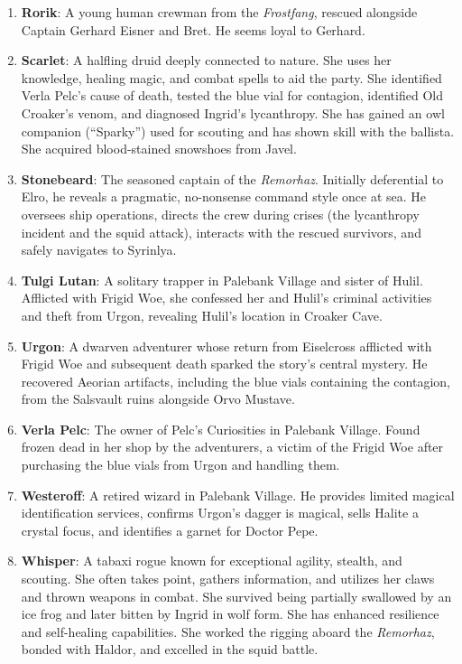 \documentclass[
  letterpaper,12pt,twoside,twocolumn,openany,
  nodeprecatedcode,bg=full]{dndbook}
\begin{document}
\begin{enumerate}
  cheek. He accompanied Urgon on the expedition where the blue vials
  were found in the Salsvault ruins (located in the Thin Sheets region).
  He provides the party with directions, details about the ruin's
  dangers (Ice Mephits, animated armor), confirms he sold his share of
  artifacts to The Buyer, and directs them to Javel for snowshoes. He is
  saddened and angered by Urgon's death.
\item
  \textbf{Rorik}: A young human crewman from the \emph{Frostfang},
  rescued alongside Captain Gerhard Eisner and Bret. He seems loyal to
  Gerhard.
\item
  \textbf{Scarlet}: A halfling druid deeply connected to nature. She
  uses her knowledge, healing magic, and combat spells to aid the party.
  She identified Verla Pelc's cause of death, tested the blue vial for
  contagion, identified Old Croaker's venom, and diagnosed Ingrid's
  lycanthropy. She has gained an owl companion (``Sparky'') used for
  scouting and has shown skill with the ballista. She acquired
  blood-stained snowshoes from Javel.
\item
  \textbf{Stonebeard}: The seasoned captain of the \emph{Remorhaz}.
  Initially deferential to Elro, he reveals a pragmatic, no-nonsense
  command style once at sea. He oversees ship operations, directs the
  crew during crises (the lycanthropy incident and the squid attack),
  interacts with the rescued survivors, and safely navigates to
  Syrinlya.
\item
  \textbf{Tulgi Lutan}: A solitary trapper in Palebank Village and
  sister of Hulil. Afflicted with Frigid Woe, she confessed her and
  Hulil's criminal activities and theft from Urgon, revealing Hulil's
  location in Croaker Cave.
\item
  \textbf{Urgon}: A dwarven adventurer whose return from Eiselcross
  afflicted with Frigid Woe and subsequent death sparked the story's
  central mystery. He recovered Aeorian artifacts, including the blue
  vials containing the contagion, from the Salsvault ruins alongside
  Orvo Mustave.
\item
  \textbf{Verla Pelc}: The owner of Pelc's Curiosities in Palebank
  Village. Found frozen dead in her shop by the adventurers, a victim of
  the Frigid Woe after purchasing the blue vials from Urgon and handling
  them.
\item
  \textbf{Westeroff}: A retired wizard in Palebank Village. He provides
  limited magical identification services, confirms Urgon's dagger is
  magical, sells Halite a crystal focus, and identifies a garnet for
  Doctor Pepe.
\item
  \textbf{Whisper}: A tabaxi rogue known for exceptional agility,
  stealth, and scouting. She often takes point, gathers information, and
  utilizes her claws and thrown weapons in combat. She survived being
  partially swallowed by an ice frog and later bitten by Ingrid in wolf
  form. She has enhanced resilience and self-healing capabilities. She
  worked the rigging aboard the \emph{Remorhaz}, bonded with Haldor, and
  excelled in the squid battle.
\end{enumerate}
\end{document}
